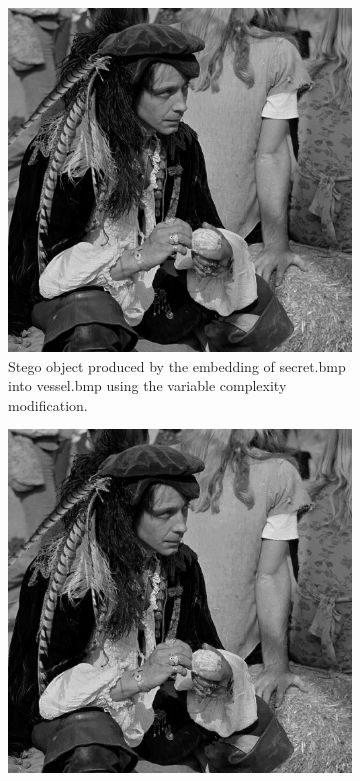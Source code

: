 \documentclass{l4proj}
\begin{document}
\begin{figure}[]
    \centering
    \begin{subfigure}[b]{0.3\textwidth}
        \includegraphics[width=\textwidth]{images/improved_stego_variable_grayingray.png}
        \caption{Stego object produced by the embedding of secret.bmp into vessel.bmp using the variable complexity modification.}
        \label{fig:variable_grayingray}
    \end{subfigure}
    \begin{subfigure}[b]{0.3\textwidth}
        \includegraphics[width=\textwidth]{images/improved_stego_rbeo_grayingray.png}

\end{subfigure}
\end{figure}
\end{document}
